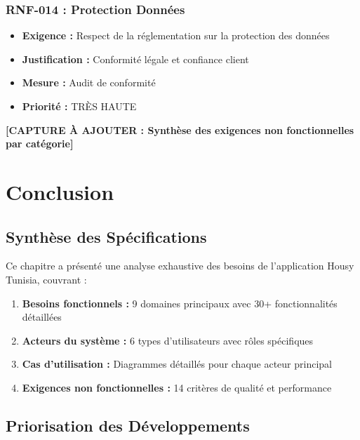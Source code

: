 \subsubsection{RNF-014 : Protection Données}
\begin{itemize}
    \item \textbf{Exigence :} Respect de la réglementation sur la protection des données
    \item \textbf{Justification :} Conformité légale et confiance client
    \item \textbf{Mesure :} Audit de conformité
    \item \textbf{Priorité :} TRÈS HAUTE
\end{itemize}

\textbf{[CAPTURE À AJOUTER : Synthèse des exigences non fonctionnelles par catégorie]}


\section{Conclusion}

\subsection{Synthèse des Spécifications}

Ce chapitre a présenté une analyse exhaustive des besoins de l'application Housy Tunisia, couvrant :

\begin{enumerate}
    \item \textbf{Besoins fonctionnels :} 9 domaines principaux avec 30+ fonctionnalités détaillées
    \item \textbf{Acteurs du système :} 6 types d'utilisateurs avec rôles spécifiques
    \item \textbf{Cas d'utilisation :} Diagrammes détaillés pour chaque acteur principal
    \item \textbf{Exigences non fonctionnelles :} 14 critères de qualité et performance
\end{enumerate}

\subsection{Priorisation des Développements}

